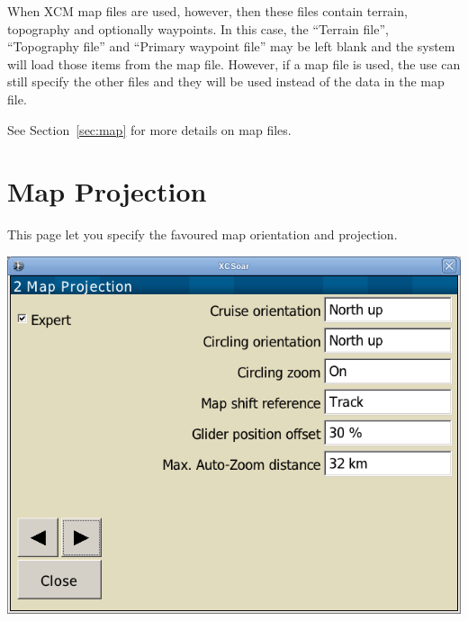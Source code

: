 When XCM map files are used, however, then these files contain terrain, topography
and optionally waypoints.  In this case, the ``Terrain file'', ``Topography file'' and 
``Primary waypoint file'' may be left blank and the system will load those items
from the map file. However, if a map file is used, the use can still specify the other
files and they will be used instead of the data in the map file.

See Section~\ref{sec:map} for more details on map files.


\clearpage
\section{Map Projection}\label{sec:map-projection}

This page let you specify the favoured map orientation and projection.

\begin{center}
\includegraphics[angle=0,width=0.8\linewidth,keepaspectratio='true']{figures/config-map_projection.png}
\end{center}

